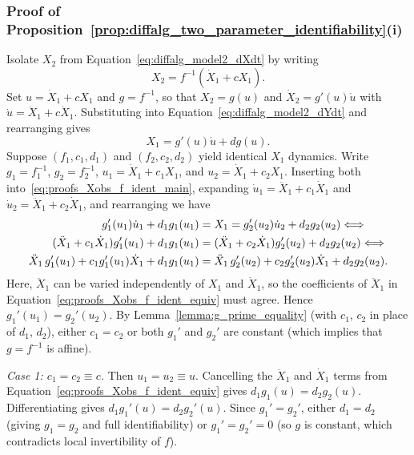 \documentclass{article}
\theoremstyle{plain}
\theoremstyle{definition}
\begin{document}
{\subsubsection{Proof of Proposition~\ref{prop:diffalg_two_parameter_identifiability}(i)} \label{appendix:proof_case3}

Isolate $X_2$ from Equation~\eqref{eq:diffalg_model2_dXdt} by writing
\begin{equation*}
    X_2 = f^{-1}(\dot{X}_1 + cX_1).
\end{equation*}
Set $u = \dot{X}_1 + cX_1$ and $g = f^{-1}$, so that $X_2 = g(u)$ and $\dot{X}_2 = g'(u)\dot{u}$ with $\dot{u} = \ddot{X}_1 + c\dot{X}_1$. Substituting into Equation~\eqref{eq:diffalg_model2_dYdt} and rearranging gives
\begin{equation}
    \label{eq:proofs_Xobs_f_ident_main}
    X_1 = g'(u)\dot{u} + dg(u).
\end{equation}
Suppose $(f_1,c_1,d_1)$ and $(f_2,c_2,d_2)$ yield identical $X_1$ dynamics. Write $g_1 = f_1^{-1}$, $g_2 = f_2^{-1}$, $u_1 = \dot{X}_1 + c_1 X_1$, and $u_2 = \dot{X}_1 + c_2 X_1$. Inserting both into~\eqref{eq:proofs_Xobs_f_ident_main}, expanding $\dot{u}_1 = \ddot{X}_1 + c_1\dot{X}_1$ and $\dot{u}_2 = \ddot{X}_1 + c_2\dot{X}_1$, and rearranging we have
\begin{align}
    \label{eq:proofs_Xobs_f_ident_equiv}
    g_1'(u_1)\dot{u}_1 + d_1 g_1(u_1) &= X_1 = g_2'(u_2)\dot{u}_2 + d_2 g_2(u_2) \notag \Longleftrightarrow \\
    (\ddot{X}_1 + c_1\dot{X}_1)g_1'(u_1) + d_1 g_1(u_1) &= (\ddot{X}_1 + c_2\dot{X}_1)g_2'(u_2) + d_2 g_2(u_2) \notag \Longleftrightarrow \\
    \ddot{X}_1\,g_1'(u_1) + c_1 g_1'(u_1)\dot{X}_1 + d_1 g_1(u_1) &= \ddot{X}_1\,g_2'(u_2) + c_2 g_2'(u_2)\dot{X}_1 + d_2 g_2(u_2).
\end{align}
Here, $\ddot{X}_1$ can be varied independently of $X_1$ and $\dot{X}_1$, so the coefficients of $\ddot{X}_1$ in Equation~\eqref{eq:proofs_Xobs_f_ident_equiv} must agree. Hence $g_1'(u_1) = g_2'(u_2)$. By Lemma~\ref{lemma:g_prime_equality} (with $c_1$, $c_2$ in place of $d_1$, $d_2$), either $c_1 = c_2$ or both $g_1'$ and $g_2'$ are constant (which implies that $g = f^{-1}$ is affine).

\medskip\noindent
\textit{Case 1: $c_1 = c_2 \equiv c$.} Then $u_1 = u_2 \equiv u$. Cancelling the $\ddot{X}_1$ and $\dot{X}_1$ terms from Equation~\eqref{eq:proofs_Xobs_f_ident_equiv} gives $d_1 g_1(u) = d_2 g_2(u)$. Differentiating gives $d_1 g_1'(u) = d_2 g_2'(u)$. Since $g_1' = g_2'$, either $d_1 = d_2$ (giving $g_1 = g_2$ and full identifiability) or $g_1' = g_2' = 0$ (so $g$ is constant, which contradicts local invertibility of $f$).

}
\end{document}
